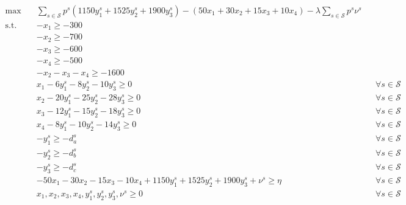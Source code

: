 \documentclass[7pt]{article}
\begin{document}
\begin{align*}
    \max \quad
     & \sum_{s \in \mathcal{S}} p^s \left(1150y_1^s + 1525y_2^s + 1900 y_3^s \right)
    - \left(50 x_1 + 30 x_2 + 15 x_3 + 10 x_4 \right) - \lambda\sum_{s \in \mathcal{S}}p^s\nu^s                                  \\
    \text{s.t.} \quad
     & -x_1 \geq -300                                                                                                            \\
     & -x_2 \geq -700                                                                                                            \\
     & -x_3 \geq -600                                                                                                            \\
     & -x_4 \geq -500                                                                                                            \\
     & -x_2 - x_3 - x_4 \geq -1600                                                                                               \\
     & x_1 - 6 y_1^s - 8 y_2^s - 10 y_3^s \geq 0 \quad                                            &  & \forall s \in \mathcal{S} \\
     & x_2 - 20 y_1^s - 25 y_2^s - 28 y_3^s \geq 0 \quad                                          &  & \forall s \in \mathcal{S} \\
     & x_3 - 12 y_1^s - 15 y_2^s - 18 y_3^s \geq 0 \quad                                          &  & \forall s \in \mathcal{S} \\
     & x_4 - 8 y_1^s - 10 y_2^s - 14 y_3^s \geq 0 \quad                                           &  & \forall s \in \mathcal{S} \\
     & -y_1^s \geq -d_a^s                                                                         &  & \forall s \in \mathcal{S} \\
     & -y_2^s \geq -d_b^s                                                                         &  & \forall s \in \mathcal{S} \\
     & -y_3^s \geq -d_c^s                                                                         &  & \forall s \in \mathcal{S} \\
     & - 50 x_1 - 30 x_2 - 15 x_3 - 10 x_4 + 1150y_1^s + 1525y_2^s + 1900 y_3^s + \nu^s \geq \eta &  & \forall s \in \mathcal{S} \\
     & x_1, x_2, x_3, x_4, y_1^s, y_2^s, y_3^s, \nu^s \geq 0                                      &  & \forall s \in \mathcal{S}
\end{align*}
\end{document}
